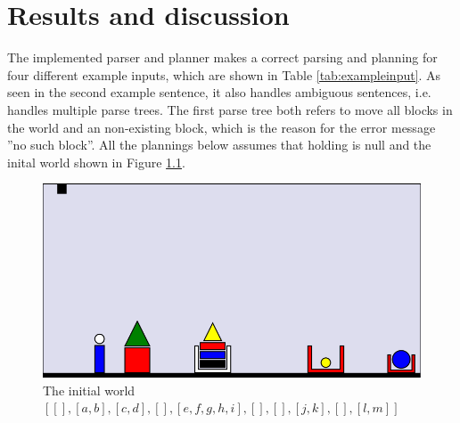 \chapter{Results and discussion}
The implemented parser and planner makes a correct parsing and planning for four different example inputs, which are shown in Table \ref{tab:exampleinput}. As seen in the second example sentence, it also handles ambiguous sentences, i.e. handles multiple parse trees. The first parse tree both refers to move all blocks in the world and an non-existing block, which is the reason for the error message ''no such block''. All the plannings below assumes that holding is null and the inital world shown in Figure \ref{fig:initworld}.\\
\begin{figure}[h!]
\centering
\includegraphics[scale = 0.4]{fig/1.png}
\caption{The initial world\\ $[[],[a,b],[c,d], [], [e,f,g,h,i],[],[],[j,k], [], [l,m]]$}
\label{fig:initworld}
\end{figure}\\
